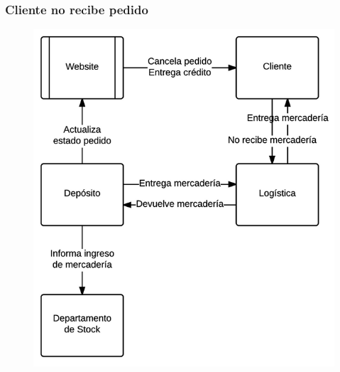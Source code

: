     \clearpage
    \subsubsection{Cliente no recibe pedido}
    \begin{figure}[H]
      \includegraphics[width=\linewidth]{images/cliente-no-recibe-pedido.png}
    \end{figure}

    \clearpage
